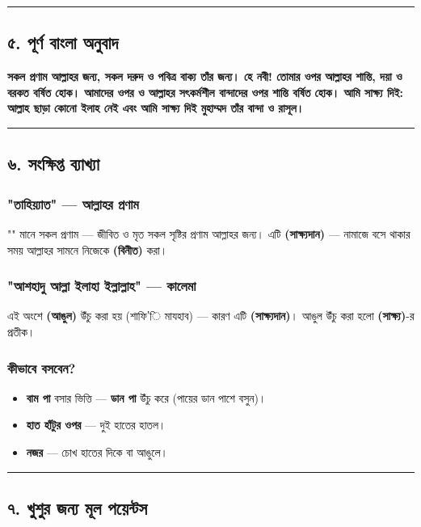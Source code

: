 \medskip\hrule\medskip

\subsection*{৫. পূর্ণ বাংলা অনুবাদ}

\textbf{সকল প্রণাম আল্লাহর জন্য, সকল দরুদ ও পবিত্র বাক্য তাঁর জন্য। হে নবী! তোমার ওপর আল্লাহর শান্তি, দয়া ও বরকত বর্ষিত হোক। আমাদের ওপর ও আল্লাহর সৎকর্মশীল বান্দাদের ওপর শান্তি বর্ষিত হোক। আমি সাক্ষ্য দিই: আল্লাহ ছাড়া কোনো ইলাহ নেই এবং আমি সাক্ষ্য দিই মুহাম্মদ তাঁর বান্দা ও রাসূল।}

\medskip\hrule\medskip

\subsection*{৬. সংক্ষিপ্ত ব্যাখ্যা}

\subsubsection*{\textbf{"তাহিয়্যাত" — আল্লাহর প্রণাম}}
"" মানে সকল প্রণাম — জীবিত ও মৃত সকল সৃষ্টির প্রণাম আল্লাহর জন্য। এটি \textbf{ (সাক্ষ্যদান)} — নামাজে বসে থাকার সময় আল্লাহর সামনে নিজেকে \textbf{ (বিনীত)} করা।

\subsubsection*{\textbf{"আশহাদু আল্লা ইলাহা ইল্লাল্লাহ" — কালেমা}}
এই অংশে \textbf{ (আঙুল)} উঁচু করা হয় (শাফি'ি মাযহাব) — কারণ এটি \textbf{ (সাক্ষ্যদান)}। আঙুল উঁচু করা হলো \textbf{ (সাক্ষ্য)}-র প্রতীক।

\subsubsection*{\textbf{কীভাবে বসবেন?}}
\begin{itemize}
\item \textbf{বাম পা} বসার ভিত্তি — \textbf{ডান পা} উঁচু করে (পায়ের ডান পাশে বসুন)।
\item \textbf{হাত হাঁটুর ওপর} — দুই হাতের হাতল।
\item \textbf{নজর} — চোখ হাতের দিকে বা আঙুলে।
\end{itemize}
\medskip\hrule\medskip

\subsection*{৭. খুশুর জন্য মূল পয়েন্টস}

